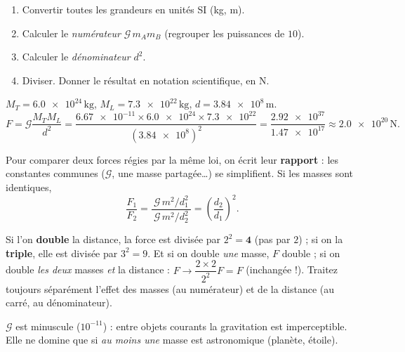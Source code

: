 \documentclass[11pt,a4paper]{article}
\begin{document}
\begin{methode}
\begin{enumerate}[leftmargin=1.6em,topsep=1pt,itemsep=0pt,label=\arabic*.]
  \item Convertir toutes les grandeurs en unités SI (kg, m).
  \item Calculer le \emph{numérateur} $\mathcal{G}\,m_A m_B$ (regrouper les
        puissances de $10$).
  \item Calculer le \emph{dénominateur} $d^2$.
  \item Diviser. Donner le résultat en notation scientifique, en \si{\newton}.
\end{enumerate}
\end{methode}

\begin{exemplebox}
$M_T=\num{6.0e24}\,\si{\kilogram}$, $M_L=\num{7.3e22}\,\si{\kilogram}$,
$d=\num{3.84e8}\,\si{\metre}$.
\[
F=\mathcal{G}\frac{M_T M_L}{d^2}
 =\frac{\num{6.67e-11}\times\num{6.0e24}\times\num{7.3e22}}{(\num{3.84e8})^2}
 =\frac{\num{2.92e37}}{\num{1.47e17}}\approx\num{2.0e20}\,\si{\newton}.
\]
\end{exemplebox}

\begin{methode}
Pour comparer deux forces régies par la même loi, on écrit leur \textbf{rapport} :
les constantes communes ($\mathcal{G}$, une masse partagée\dots) se simplifient.
Si les masses sont identiques,
\[
\frac{F_1}{F_2}=\frac{\ \mathcal{G}\,m^2/d_1^2\ }{\ \mathcal{G}\,m^2/d_2^2\ }
=\left(\frac{d_2}{d_1}\right)^{2}.
\]
\end{methode}

\begin{piege}
Si l'on \textbf{double} la distance, la force est divisée par $2^2=\mathbf{4}$ (pas par
$2$) ; si on la \textbf{triple}, elle est divisée par $3^2=9$. Et si on double
\emph{une} masse, $F$ double ; si on double \emph{les deux} masses \emph{et} la
distance : $F\to \dfrac{2\times 2}{2^2}F=F$ (inchangée !). Traitez toujours
séparément l'effet des masses (au numérateur) et de la distance (au carré, au
dénominateur).
\end{piege}

\begin{remarque}
$\mathcal{G}$ est minuscule ($10^{-11}$) : entre objets courants la gravitation est
imperceptible. Elle ne domine que si \emph{au moins une} masse est astronomique
(planète, étoile).
\end{remarque}
\end{document}
